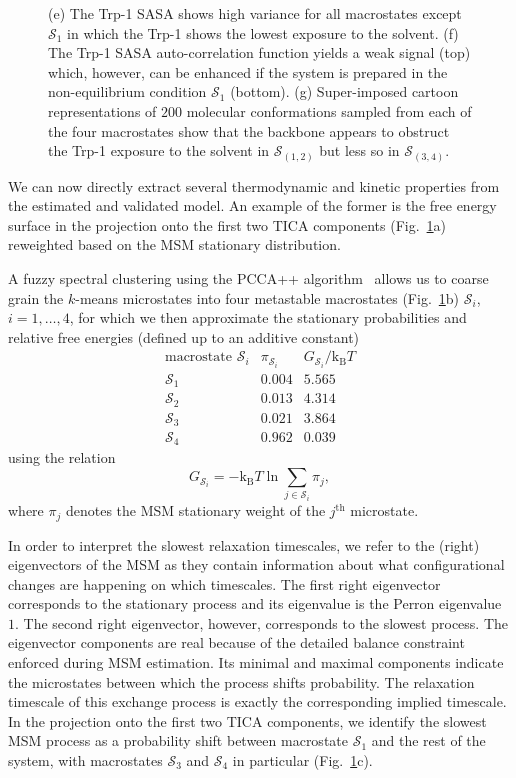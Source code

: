 \documentclass[9pt,tutorial]{livecoms}
\begin{document}
\begin{figure}
{(e) The Trp-1 SASA shows high variance for all macrostates except $\mathcal{S}_1$ in which the Trp-1 shows the lowest exposure to the solvent.
(f) The Trp-1 SASA auto-correlation function yields a weak signal (top) which, however, can be enhanced if the system is prepared in the non-equilibrium condition $\mathcal{S}_1$ (bottom).
(g) Super-imposed cartoon representations of $200$ molecular conformations sampled from each of the four macrostates show that the backbone appears to obstruct the Trp-1 exposure to the solvent in $\mathcal{S}_{(1,2)}$ but less so in $\mathcal{S}_{(3,4)}$.}
\label{fig:msm-analysis}
\end{figure}

We can now directly extract several thermodynamic and kinetic properties from the estimated and validated model.
An example of the former is the free energy surface in the projection onto the first two TICA components (Fig.~\ref{fig:msm-analysis}a) reweighted based on the MSM stationary distribution.

A fuzzy spectral clustering using the PCCA++ algorithm~\cite{pcca++} allows us to coarse grain the $k$-means microstates into four metastable macrostates (Fig.~\ref{fig:msm-analysis}b) $\mathcal{S}_i$, $i=1,\dots,4$, for which we then approximate the stationary probabilities and relative free energies (defined up to an additive constant)
\[ \begin{array}{ccc}
\textrm{macrostate } \mathcal{S}_i & \pi_{\mathcal{S}_i} & G_{\mathcal{S}_i} / \textrm{k}_\textrm{B} T \\
\hline
\mathcal{S}_1 & 0.004 & 5.565 \\
\mathcal{S}_2 & 0.013 & 4.314 \\
\mathcal{S}_3 & 0.021 & 3.864 \\
\mathcal{S}_4 & 0.962 & 0.039
\end{array}\]
using the relation
\begin{equation}
\label{eq:fe}
G_{\mathcal{S}_i} = - \textrm{k}_\textrm{B} T \ln \sum\limits_{j\in \mathcal{S}_i} \pi_j,
\end{equation}
where $\pi_j$ denotes the MSM stationary weight of the $j^\textrm{th}$ microstate.

In order to interpret the slowest relaxation timescales, we refer to the (right) eigenvectors of the MSM as they contain information about what configurational changes are happening on which timescales.
The first right eigenvector corresponds to the stationary process and its eigenvalue is the Perron eigenvalue $1$.
The second right eigenvector, however, corresponds to the slowest process.
The eigenvector components are real because of the detailed balance constraint enforced during MSM estimation.
Its minimal and maximal components indicate the microstates between which the process shifts probability.
The relaxation timescale of this exchange process is exactly the corresponding implied timescale.
In the projection onto the first two TICA components, we identify the slowest MSM process as a probability shift between macrostate $\mathcal{S}_1$ and the rest of the system, with macrostates $\mathcal{S}_3$ and $\mathcal{S}_4$ in particular (Fig.~\ref{fig:msm-analysis}c).
\end{document}
